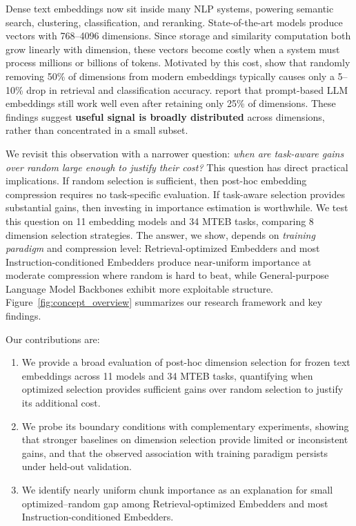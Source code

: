 \documentclass[11pt,a4paper]{article}
\begin{document}
Dense text embeddings now sit inside many NLP systems, powering semantic search, clustering, classification, and reranking. State-of-the-art models produce vectors with 768–4096 dimensions. Since storage and similarity computation both grow linearly with dimension, these vectors become costly when a system must process millions or billions of tokens. Motivated by this cost, \citet{takeshita2025randomly} show that randomly removing 50\% of dimensions from modern embeddings typically causes only a 5--10\% drop in retrieval and classification accuracy. \citet{tsukagoshi2025redundancy} report that prompt-based LLM embeddings still work well even after retaining only 25\% of dimensions. These findings suggest \textbf{useful signal is broadly distributed} across dimensions, rather than concentrated in a small subset. 

We revisit this observation with a narrower question: \emph{when are task-aware gains over random large enough to justify their cost?} This question has direct practical implications. If random selection is sufficient, then post-hoc embedding compression requires no task-specific evaluation. If task-aware selection provides substantial gains, then investing in importance estimation is worthwhile. We test this question on 11 embedding models and 34 MTEB tasks, comparing 8 dimension selection strategies. The answer, we show, depends on \emph{training paradigm} and compression level: Retrieval-optimized Embedders and most Instruction-conditioned Embedders produce near-uniform importance at moderate compression where random is hard to beat, while General-purpose Language Model Backbones exhibit more exploitable structure. Figure~\ref{fig:concept_overview} summarizes our research framework and key findings.

Our contributions are:
\begin{enumerate}
    \item We provide a broad evaluation of post-hoc dimension selection for frozen text embeddings across 11 models and 34 MTEB tasks, quantifying when optimized selection provides sufficient gains over random selection to justify its additional cost.
    \item We probe its boundary conditions with complementary experiments, showing that stronger baselines on dimension selection provide limited or inconsistent gains, and that the observed association with training paradigm persists under held-out validation.
    \item We identify nearly uniform chunk importance as an explanation for small optimized--random gap among Retrieval-optimized Embedders and most Instruction-conditioned Embedders.
\end{enumerate}
\end{document}
